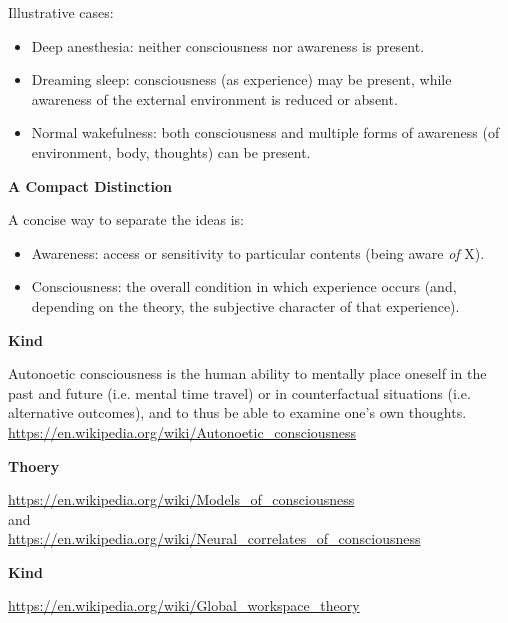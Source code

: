 \documentclass{book}
\providecommand{\ProjectDeepHeading}[2]{%
    \par\medskip\noindent\textbf{#2}\par\smallskip
}
\begin{document}
        Illustrative cases:
        \begin{itemize}
            \item Deep anesthesia: neither consciousness nor awareness is present.
            \item Dreaming sleep: consciousness (as experience) may be present, while awareness of the external environment is reduced or absent.
            \item Normal wakefulness: both consciousness and multiple forms of awareness (of environment, body, thoughts) can be present.
        \end{itemize}
    
    
    \ProjectDeepHeading{4}{A Compact Distinction}
        
        A concise way to separate the ideas is:
        \begin{itemize}
            \item Awareness: access or sensitivity to particular contents (being aware \emph{of} X).
            \item Consciousness: the overall condition in which experience occurs (and, depending on the theory, the subjective character of that experience).
        \end{itemize}

\ProjectDeepHeading{1}{Kind}


Autonoetic consciousness is the human ability to mentally place oneself in the past and future (i.e. mental time travel) or in counterfactual situations (i.e. alternative outcomes), and to thus be able to examine one's own thoughts.
    \url{https://en.wikipedia.org/wiki/Autonoetic_consciousness}

\ProjectDeepHeading{1}{Thoery}


\url{https://en.wikipedia.org/wiki/Models_of_consciousness} 
    \\ 
    and
    \\
    \url{https://en.wikipedia.org/wiki/Neural_correlates_of_consciousness}

\ProjectDeepHeading{2}{Kind}


\url{https://en.wikipedia.org/wiki/Global_workspace_theory}
\end{document}
